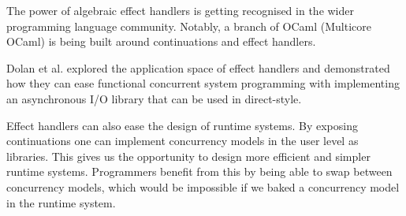 \documentclass[class=article,crop=false,11pt]{standalone}
\begin{document}
The power of algebraic effect handlers is getting recognised in the wider programming language community. 
Notably, a branch of OCaml (Multicore OCaml) is being built around
continuations and effect handlers.

Dolan et al. \cite{dolan2017concurrent} explored the application space of effect handlers and 
demonstrated how they can ease functional concurrent system programming with implementing an asynchronous I/O 
library that can be used in direct-style.

Effect handlers can also ease the design of runtime systems. By exposing continuations one
can implement concurrency models in the user level as libraries. This gives us the opportunity
to design more efficient and simpler runtime systems. Programmers benefit from this by
being able to swap between concurrency models, which would be impossible if we baked a
concurrency model in the runtime system.

\ifstandalone
{}

\fi
\end{document}
